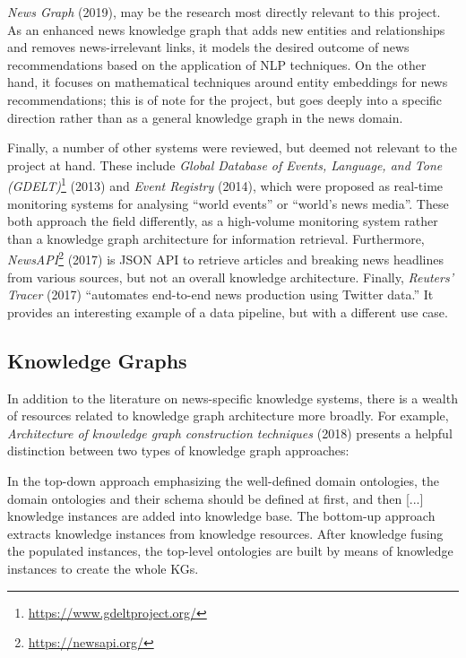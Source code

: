 \documentclass[11pt]{article}
\begin{document}
  \textit{News Graph} \cite{liu2019news} (2019), may be the research most directly relevant to this project. As an enhanced news knowledge graph that adds new entities and relationships and removes news-irrelevant links, it models the desired outcome of news recommendations based on the application of NLP techniques. On the other hand, it focuses on mathematical techniques around entity embeddings for news recommendations; this is of note for the project, but goes deeply into a specific direction rather than as a general knowledge graph in the news domain.

  Finally, a number of other systems were reviewed, but deemed not relevant to the project at hand. These include \textit{Global Database of Events, Language, and Tone (GDELT)}\footnote{\url{https://www.gdeltproject.org/}} (2013) and \textit{Event Registry} \cite{leban2014event} (2014), which were proposed as real-time monitoring systems for analysing ``world events'' or ``world's news media''. These both approach the field differently, as a high-volume monitoring system rather than a knowledge graph architecture for information retrieval. Furthermore, \textit{NewsAPI}\footnote{\url{https://newsapi.org/}} (2017) is JSON API to retrieve articles and breaking news headlines from various sources, but not an overall knowledge architecture. Finally, \textit{Reuters' Tracer} \cite{liu2017reuters} (2017) ``automates end-to-end news production using Twitter data.'' It provides an interesting example of a data pipeline, but with a different use case.

  \subsection{Knowledge Graphs}

  In addition to the literature on news-specific knowledge systems, there is a wealth of resources related to knowledge graph architecture more broadly. For example, \textit{Architecture of knowledge graph construction techniques} (2018) \cite{zhao2018architecture} presents a helpful distinction between two types of knowledge graph approaches:

  \begin{displayquote}
  In the top-down approach emphasizing the well-defined domain ontologies, the domain ontologies and their schema should be defined at first, and then [...] knowledge instances are added into knowledge base. The bottom-up approach extracts knowledge instances from knowledge resources. After knowledge fusing the populated instances, the top-level ontologies are built by means of knowledge instances to create the whole KGs.
  \end{displayquote}
\end{document}
